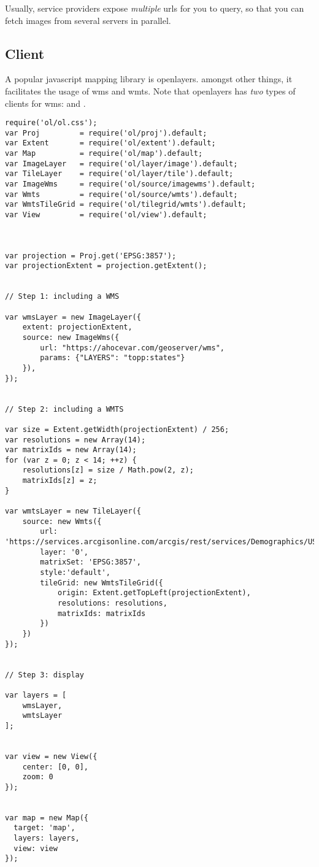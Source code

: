 Usually, service providers expose \emph{multiple} urls for you to query, so that you can fetch images from several servers in parallel. 

\subsection{Client}
A popular javascript mapping library is openlayers. amongst other things, it facilitates the usage of wms and wmts. Note that openlayers has \emph{two} types of clients for wms:  and .

\begin{lstlisting}
require('ol/ol.css');
var Proj         = require('ol/proj').default;
var Extent       = require('ol/extent').default;
var Map          = require('ol/map').default;
var ImageLayer   = require('ol/layer/image').default;
var TileLayer    = require('ol/layer/tile').default;
var ImageWms     = require('ol/source/imagewms').default;
var Wmts         = require('ol/source/wmts').default;
var WmtsTileGrid = require('ol/tilegrid/wmts').default;
var View         = require('ol/view').default;



var projection = Proj.get('EPSG:3857');
var projectionExtent = projection.getExtent();


// Step 1: including a WMS

var wmsLayer = new ImageLayer({
    extent: projectionExtent,
    source: new ImageWms({
        url: "https://ahocevar.com/geoserver/wms",
        params: {"LAYERS": "topp:states"}
    }),
});


// Step 2: including a WMTS

var size = Extent.getWidth(projectionExtent) / 256;
var resolutions = new Array(14);
var matrixIds = new Array(14);
for (var z = 0; z < 14; ++z) {
    resolutions[z] = size / Math.pow(2, z);
    matrixIds[z] = z;
}

var wmtsLayer = new TileLayer({
    source: new Wmts({
        url: 'https://services.arcgisonline.com/arcgis/rest/services/Demographics/USA_Population_Density/MapServer/WMTS/',
        layer: '0',
        matrixSet: 'EPSG:3857',
        style:'default',
        tileGrid: new WmtsTileGrid({
            origin: Extent.getTopLeft(projectionExtent),
            resolutions: resolutions,
            matrixIds: matrixIds
        })
    })
});


// Step 3: display

var layers = [
    wmsLayer,
    wmtsLayer
];


var view = new View({
    center: [0, 0],
    zoom: 0
});


var map = new Map({
  target: 'map',
  layers: layers,
  view: view
});

\end{lstlisting}